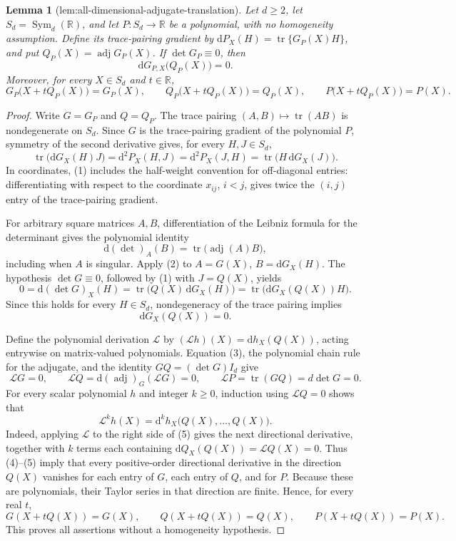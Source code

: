 \documentclass{article}
\newtheorem{lemma}{Lemma}
\begin{document}
\begin{lemma}[lem:all-dimensional-adjugate-translation]\label{lem:all-dimensional-adjugate-translation}
Let \(d\geq2\), let \(S_d=\operatorname{Sym}_{d}(\mathbb R)\), and let \(P:S_d\to\mathbb R\) be a polynomial, with no homogeneity assumption.  Define its trace-pairing gradient by \(\mathrm dP_X(H)=\operatorname{tr}\{G_P(X)H\}\), and put \(Q_P(X)=\operatorname{adj}G_P(X)\).  If \(\det G_P\equiv0\), then
\[
 \mathrm dG_{P,X}\bigl(Q_P(X)\bigr)=0.
\]
Moreover, for every \(X\in S_d\) and \(t\in\mathbb R\),
\[
 G_P\bigl(X+tQ_P(X)\bigr)=G_P(X),\qquad
 Q_P\bigl(X+tQ_P(X)\bigr)=Q_P(X),\qquad
 P\bigl(X+tQ_P(X)\bigr)=P(X).
\]
\end{lemma}
\begin{proof}
Write \(G=G_P\) and \(Q=Q_P\).  The trace pairing \((A,B)\mapsto\operatorname{tr}(AB)\) is nondegenerate on \(S_d\).  Since \(G\) is the trace-pairing gradient of the polynomial \(P\), symmetry of the second derivative gives, for every \(H,J\in S_d\),
\[
 \operatorname{tr}\bigl(\mathrm dG_X(H)J\bigr)
 =\mathrm d^2P_X(H,J)
 =\mathrm d^2P_X(J,H)
 =\operatorname{tr}\bigl(H\,\mathrm dG_X(J)\bigr). \tag{1}
\]
In coordinates, (1) includes the half-weight convention for off-diagonal entries: differentiating with respect to the coordinate \(x_{ij}\), \(i<j\), gives twice the \((i,j)\) entry of the trace-pairing gradient.

For arbitrary square matrices \(A,B\), differentiation of the Leibniz formula for the determinant gives the polynomial identity
\[
 \mathrm d(\det)_A(B)=\operatorname{tr}\bigl(\operatorname{adj}(A)B\bigr), \tag{2}
\]
including when \(A\) is singular.  Apply (2) to \(A=G(X)\), \(B=\mathrm dG_X(H)\).  The hypothesis \(\det G\equiv0\), followed by (1) with \(J=Q(X)\), yields
\[
 0=\mathrm d(\det G)_X(H)
 =\operatorname{tr}\bigl(Q(X)\,\mathrm dG_X(H)\bigr)
 =\operatorname{tr}\bigl(\mathrm dG_X(Q(X))H\bigr).
\]
Since this holds for every \(H\in S_d\), nondegeneracy of the trace pairing implies
\[
 \mathrm dG_X(Q(X))=0. \tag{3}
\]

Define the polynomial derivation \(\mathcal L\) by \((\mathcal Lh)(X)=\mathrm dh_X(Q(X))\), acting entrywise on matrix-valued polynomials.  Equation (3), the polynomial chain rule for the adjugate, and the identity \(GQ=(\det G)I_d\) give
\[
 \mathcal LG=0,
 \qquad
 \mathcal LQ=\mathrm d(\operatorname{adj})_{G}(\mathcal LG)=0,
 \qquad
 \mathcal LP=\operatorname{tr}(GQ)=d\det G=0. \tag{4}
\]
For every scalar polynomial \(h\) and integer \(k\geq0\), induction using \(\mathcal LQ=0\) shows that
\[
 \mathcal L^kh(X)=\mathrm d^kh_X\bigl(Q(X),\ldots,Q(X)\bigr). \tag{5}
\]
Indeed, applying \(\mathcal L\) to the right side of (5) gives the next directional derivative, together with \(k\) terms each containing \(\mathrm dQ_X(Q(X))=\mathcal LQ(X)=0\).  Thus (4)--(5) imply that every positive-order directional derivative in the direction \(Q(X)\) vanishes for each entry of \(G\), each entry of \(Q\), and for \(P\).  Because these are polynomials, their Taylor series in that direction are finite.  Hence, for every real \(t\),
\[
 G(X+tQ(X))=G(X),
 \qquad
 Q(X+tQ(X))=Q(X),
 \qquad
 P(X+tQ(X))=P(X).
\]
This proves all assertions without a homogeneity hypothesis.
\end{proof}
\end{document}
